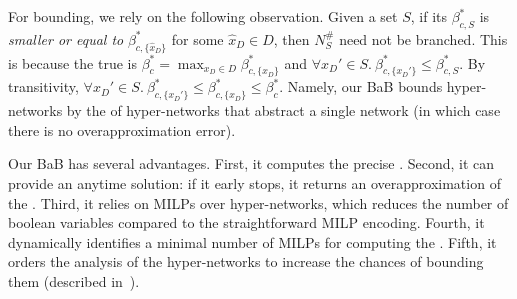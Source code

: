 For bounding, we rely on the following observation. Given a set $S$, if its \propa $\beta^*_{c,S}$ is \emph{smaller or equal to} $\beta^*_{c,\{\hat{x}_D\}}$ for some $\hat{x}_D \in D$, then $N^\#_S$ need not be branched. This is because the true \propa is $\beta_c^* = \max_{x_D \in D}\beta^*_{c,\{x_D\}}$ and $\forall x_D'\in S.\ \beta^*_{c,\{x_D'\}}\leq \beta^*_{c,S}$. By transitivity,  $\forall x_D'\in S.\ \beta^*_{c,\{x_D'\}}\leq \beta^*_{c,\{\hat{x}_D\}}\leq \beta^*_{c}$. Namely, our BaB bounds hyper-networks by the \propa of hyper-networks that abstract a single network (in which case there is no overapproximation error). 


Our BaB has several advantages. First, it computes the precise \propa. %
Second, it can provide an anytime solution: if it early stops, it returns an overapproximation of the \propa. Third, it relies on MILPs over hyper-networks, which reduces the number of boolean variables compared to the straightforward MILP encoding. Fourth, it dynamically identifies a minimal number of MILPs for computing the \propa. Fifth, it orders the analysis of the hyper-networks to increase the chances of bounding them (described in~).


